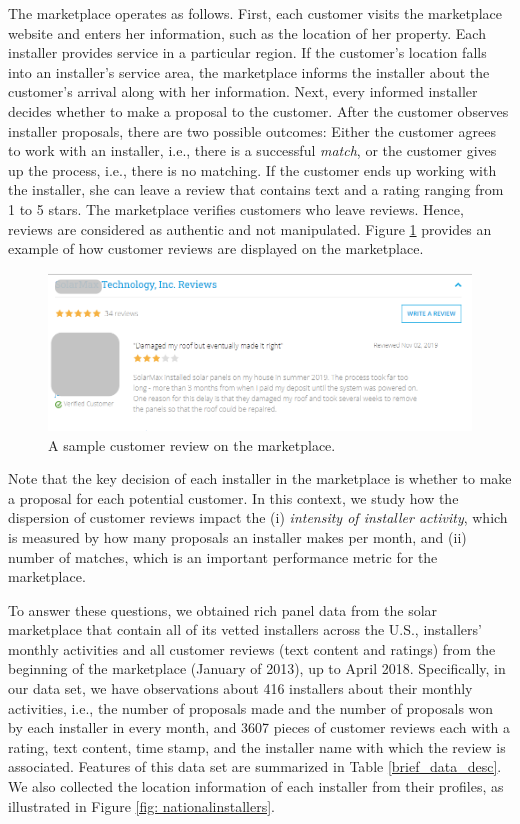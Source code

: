\documentclass[msom,blindrev]{informs3}
\begin{document}
The marketplace operates as follows. First, each customer visits the marketplace website and enters her information, such as the location of her property. Each installer provides service in a particular region. If the customer's location falls into an installer's service area, the marketplace informs the installer about the customer's arrival along with her information. Next, every informed installer decides whether to make a proposal to the customer. After the customer observes installer proposals, there are two possible outcomes: Either the customer agrees to work with an installer, i.e., there is a successful \emph{match}, or the customer gives up the process, i.e., there is no matching. If the customer ends up working with the installer, she can leave a review that contains text and a rating ranging from 1 to 5 stars. The marketplace verifies customers who leave reviews. Hence, reviews are considered as authentic and not manipulated. Figure \ref{reviews_example} provides an example of how customer reviews are displayed on the marketplace.


\begin{figure}
	\centering
	\includegraphics[width=0.81\linewidth]{reviews_example.png}
	\caption{A sample customer review on the marketplace.}
	\label{reviews_example}
\end{figure}

Note that the key decision of each installer in the marketplace is whether to make a proposal for each potential customer.
 In this context, we study how the dispersion of customer reviews impact the (i) \emph{intensity of installer activity}, which is measured by how many proposals an installer makes per month, and (ii) number of matches, which is an important performance metric for the marketplace.

To answer these questions, we obtained rich panel data from the solar marketplace that contain all of its vetted installers across the U.S., installers' monthly activities and all customer reviews (text content and ratings) from the beginning of the marketplace (January of 2013), up to April 2018. Specifically, in our data set, we have observations about 416 installers about their monthly activities, i.e., the number of proposals made and the number of proposals won by each installer in every month, and 3607 pieces of customer reviews each with a rating, text content, time stamp, and the installer name with which the review is associated. Features of this data set are summarized in Table \ref{brief_data_desc}. We also collected the location information of each installer from their profiles, as illustrated in Figure \ref{fig: nationalinstallers}.
\end{document}
